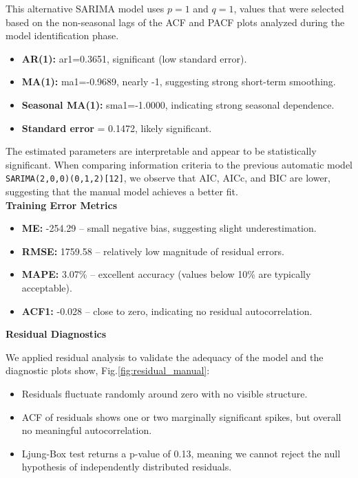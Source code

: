 This alternative SARIMA model uses \( p = 1 \) and \( q = 1 \), values that were selected based on the non-seasonal lags of the ACF and PACF plots analyzed during the model identification phase.\\

\begin{itemize}
    \item \textbf{AR(1):} ar1=0.3651, significant (low standard error).
    \item \textbf{MA(1):} ma1=-0.9689, nearly -1, suggesting strong short-term smoothing.
    \item \textbf{Seasonal MA(1):} sma1=-1.0000, indicating strong seasonal dependence.
    \item \textbf{Standard error } = 0.1472, likely significant.
\end{itemize}

The estimated parameters are interpretable and appear to be statistically significant. When comparing information criteria to the previous automatic model \texttt{SARIMA(2,0,0)(0,1,2)[12]}, we observe that AIC, AICc, and BIC are lower, suggesting that the manual model achieves a better fit.\\

\noindent\textbf{Training Error Metrics}

\begin{itemize}
\item \textbf{ME:} -254.29 – small negative bias, suggesting slight underestimation.
\item \textbf{RMSE:} 1759.58 – relatively low magnitude of residual errors.
\item \textbf{MAPE:} 3.07\% – excellent accuracy (values below 10\% are typically acceptable).
\item \textbf{ACF1:} -0.028 – close to zero, indicating no residual autocorrelation.
\end{itemize}

\noindent\textbf{Residual Diagnostics}

We applied residual analysis to validate the adequacy of the model and the diagnostic plots show, Fig.\ref{fig:residual_manual}:

\begin{itemize}
    \item Residuals fluctuate randomly around zero with no visible structure.
    \item ACF of residuals shows one or two marginally significant spikes, but overall no meaningful autocorrelation.
    \item Ljung-Box test returns a p-value of 0.13, meaning we cannot reject the null hypothesis of independently distributed residuals.
\end{itemize}

